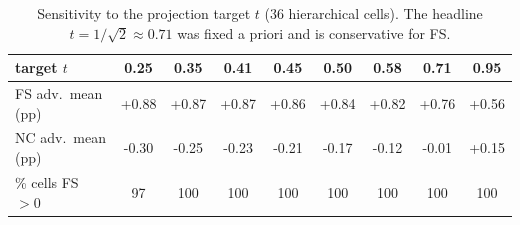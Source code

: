 \begin{table}[H]
\centering
\small
\begin{tabular}{lcccccccc}
\toprule
target $t$ & 0.25 & 0.35 & 0.41 & 0.45 & 0.50 & 0.58 & 0.71 & 0.95 \\
\midrule
FS adv.\ mean (pp) & +0.88 & +0.87 & +0.87 & +0.86 & +0.84 & +0.82 & +0.76 & +0.56 \\
NC adv.\ mean (pp) & -0.30 & -0.25 & -0.23 & -0.21 & -0.17 & -0.12 & -0.01 & +0.15 \\
\% cells FS $>0$ & 97 & 100 & 100 & 100 & 100 & 100 & 100 & 100 \\
\bottomrule
\end{tabular}
\caption{Sensitivity to the projection target $t$ (36 hierarchical cells). The headline $t=1/\sqrt2\approx0.71$ was fixed a priori and is conservative for FS.}
\label{tab:b4-tsweep}
\end{table}
